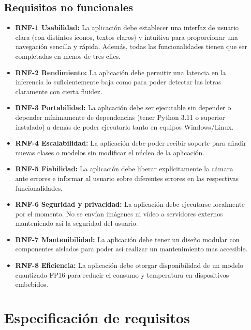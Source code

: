 \subsection{Requisitos no funcionales}
\begin{itemize}
    \item \textbf{RNF-1 Usabilidad:} La aplicación debe establecer una interfaz de usuario clara (con distintos iconos, textos claros) y intuitiva para proporcionar una navegación sencilla y rápida. Además, todas las funcionalidades tienen que ser completadas en menos de tres clics.
    \item \textbf{RNF-2 Rendimiento:} La aplicación debe permitir una latencia en la inferencia lo suficientemente baja como para poder detectar las letras claramente con cierta fluidez.
    \item \textbf{RNF-3 Portabilidad:} La aplicación debe ser ejecutable sin depender o depender mínimamente de dependencias (tener Python 3.11 o superior instalado) a demás de poder ejecutarlo tanto en equipos Windows/Linux.
    \item \textbf{RNF-4 Escalabilidad:} La aplicación debe poder recibir soporte para añadir nuevas clases o modelos sin modificar el núcleo de la aplicación.
    \item \textbf{RNF-5 Fiabilidad:} La aplicación debe liberar explícitamente la cámara ante errores e informar al usuario sobre diferentes errores en las respectivas funcionalidades.
    \item \textbf{RNF-6 Seguridad y privacidad:} La aplicación debe ejecutarse localmente por el momento. No se envían imágenes ni vídeo a servidores externos manteniendo así la seguridad del usuario.
    \item \textbf{RNF-7 Mantenibilidad:} La aplicación debe tener un diseño modular con componentes aislados para poder así realizar un mantenimiento mas accesible.
    \item \textbf{RNF-8 Eficiencia:} La aplicación debe otorgar disponibilidad de un modelo cuantizado FP16 para reducir el consumo y temperatura en dispositivos embebidos.
\end{itemize}

\section{Especificación de requisitos}


